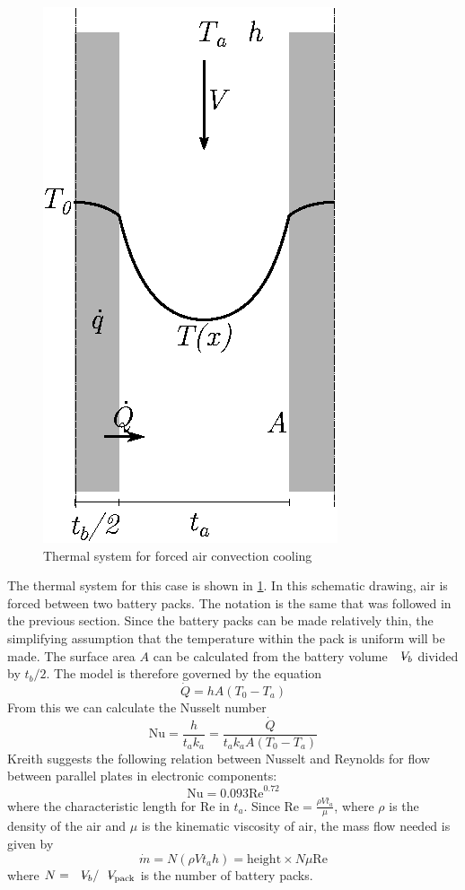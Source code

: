 \begin{figure}
    \centering
    \includegraphics{fig/convection.eps}
    \caption{Thermal system for forced air convection cooling}
    \label{fig:convection}
\end{figure}

The thermal system for this case is shown in \cref{fig:convection}. In this schematic drawing, air is forced between two battery packs. The notation is the same that was followed in the previous section. Since the battery packs can be made relatively thin, the simplifying assumption that the temperature within the pack is uniform will be made.
The surface area $A$ can be calculated from the battery volume $\volume_b$ divided by $t_b/2$. The model is therefore governed by the equation
\begin{equation}
\dot{Q} = hA(T_0-T_a)
\end{equation}
From this we can calculate the Nusselt number
\begin{equation}
    \text{Nu} = \frac{h}{t_a k_a} = \frac{\dot{Q}}{t_a k_a A(T_0-T_a)}
\end{equation}
Kreith \cite{kreith} suggests the following relation between Nusselt and Reynolds for flow between parallel plates in electronic components:
\begin{equation}
    \text{Nu} = 0.093\text{Re}^{0.72}
\end{equation}
where the characteristic length for Re in $t_a$. Since $\text{Re} = \frac{\rho V t_a}{\mu}$, where $\rho$ is the density of the air and $\mu$ is the kinematic viscosity of air, the mass flow needed is given by
\begin{equation}
    \dot{m} = N (\rho V t_a h) = \text{height} \times N \mu \text{Re}
\end{equation}
where $N = \volume_b/\volume_\text{pack}$ is the number of battery packs.

